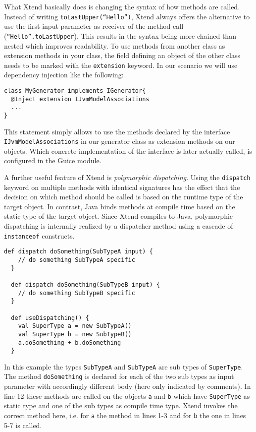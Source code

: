 What Xtend basically does is changing the syntax of how methods are called. Instead
of writing \texttt{toLastUpper(``Hello'')}, Xtend always offers the alternative to
use the first input parameter as receiver of the method call (\texttt{``Hello''.toLastUpper}).
This results in the syntax being more chained than nested which improves readability.
To use methods from another class as extension methods in your class, the field
defining an object of the other class needs to be marked with the \texttt{extension}
keyword. In our scenario we will use dependency injection like the following:

\begin{lstlisting}[language=Xtend]
class MyGenerator implements IGenerator{
  @Inject extension IJvmModelAssociations
  ...
}
\end{lstlisting}

This statement simply allows to use the methods declared by the interface
\newline\texttt{IJvmModelAssociations} in our generator class as extension methods
on our objects. Which concrete implementation of the interface is later actually called, is configured in the Guice module.

A further useful feature of Xtend is \emph{polymorphic dispatching}. Using the \texttt{dispatch}
keyword on multiple methods with identical signatures has the effect that the 
decision on which method should be called is based on the runtime type of the
target object. In contrast, Java binds methods at compile time based on the static
type of the target object. Since Xtend compiles to Java, polymorphic dispatching
is internally realized by a dispatcher method using a cascade of
\texttt{instanceof} constructs. 

\begin{lstlisting}[language=Xtend]
  def dispatch doSomething(SubTypeA input) {
  	// do something SubTypeA specific
  }
  
  def dispatch doSomething(SubTypeB input) {
  	// do something SubTypeB specific
  }
  
  def useDispatching() {
	val SuperType a = new SubTypeA()
	val SuperType b = new SubTypeB()
    a.doSomething + b.doSomething
  }
\end{lstlisting}

In this example the types \texttt{SubTypeA} and \texttt{SubTypeA} are sub types
of \texttt{SuperType}. The method \texttt{doSomething} is declared for each of
the two sub types as input parameter with accordingly different body (here
only indicated by comments). In line 12 these methods are called on the objects
\texttt{a} and \texttt{b} which have \texttt{SuperType} as static type and one
of the sub types as compile time type. Xtend invokes the correct method here,
i.e. for \texttt{a} the method in lines 1-3 and for \texttt{b} the one in lines
5-7 is called.

